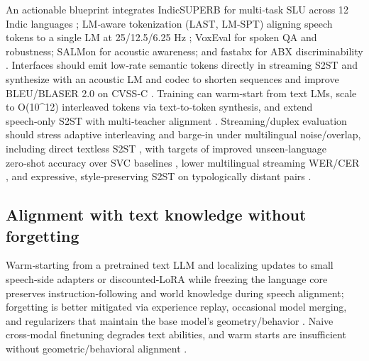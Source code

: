 An actionable blueprint integrates IndicSUPERB for multi‑task SLU across 12 Indic languages \cite{entry2025indicsuperbspeechprocessinguniversalperf}; LM‑aware tokenization (LAST, LM‑SPT) aligning speech tokens to a single LM at 25/12.5/6.25 Hz \cite{turetzky2024lastlanguagemodelawarespeechtokenization,jo2025lmsptalignedsemanticdistillationspeechto}; VoxEval for spoken QA and robustness; SALMon for acoustic awareness; and fastabx for ABX discriminability \cite{cui2025voxevalbenchmarkingknowledgeunderstandin,maimon2025salmonsuiteacousticlanguagemodelevaluati,poli2025fastabxlibraryefficientcomputationabxdis}. Interfaces should emit low‑rate semantic tokens directly in streaming S2ST and synthesize with an acoustic LM and codec to shorten sequences and improve BLEU/BLASER 2.0 on CVSS‑C \cite{zhao2024textlessstreamingspeechtranslationsemant,jo2025lmsptalignedsemanticdistillationspeechto}. Training can warm‑start from text LMs, scale to O(10^{12}) interleaved tokens via text‑to‑token synthesis, and extend speech‑only S2ST with multi‑teacher alignment \cite{hassid2024textuallypretrainedspeechlanguagemodels,turetzky2024lastlanguagemodelawarespeechtokenization,zeng2024scalingspeechtextpretrainingsyntheticint}. Streaming/duplex evaluation should stress adaptive interleaving and barge‑in under multilingual noise/overlap, including direct textless S2ST \cite{hu2025salmduplexefficientdirectmodelingspeechl,zhao2024textlessstreamingspeechtranslationsemant,wang2023slmbridgethingapbetweenspeechtextfoundat}, with targets of improved unseen‑language zero‑shot accuracy over SVC baselines \cite{hsu2024exploringcontextlearningtextlessspeechla}, lower multilingual streaming WER/CER \cite{li2025transsionmultilingualspeechrecognitionsy}, and expressive, style‑preserving S2ST on typologically distant pairs \cite{huang2023holisticcascadesystembenchmarkhumanevalu}.

\subsection{Alignment with text knowledge without forgetting} \label{subsec:Alignment with text knowledge without forgetting}

Warm‑starting from a pretrained text LLM and localizing updates to small speech‑side adapters or discounted‑LoRA while freezing the language core preserves instruction‑following and world knowledge during speech alignment; forgetting is better mitigated via experience replay, occasional model merging, and regularizers that maintain the base model’s geometry/behavior \cite{hsiao2025analyzingmitigationstrategiescatastrophi,hassid2024textuallypretrainedspeechlanguagemodels,lu2024destaenhancingspeechlanguagemodelsthroug,wang2023slmbridgethingapbetweenspeechtextfoundat}. Naive cross‑modal finetuning degrades text abilities, and warm starts are insufficient without geometric/behavioral alignment \cite{peng2024mslms2stmultitaskspeechlanguagemodeltext}.

